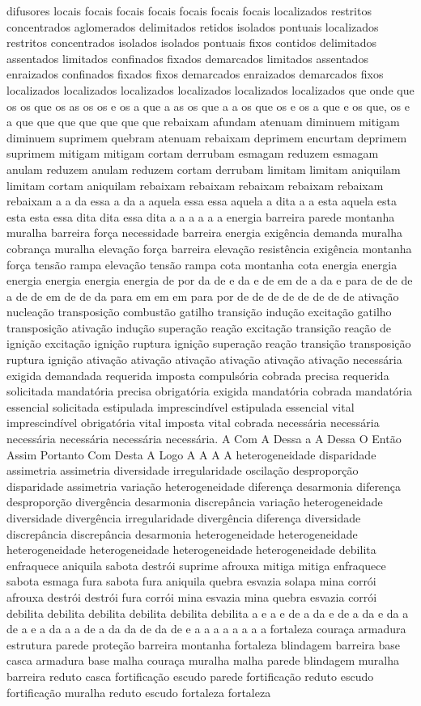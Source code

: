 difusores locais focais focais focais focais focais focais localizados restritos concentrados aglomerados delimitados retidos isolados pontuais localizados restritos concentrados isolados isolados pontuais fixos contidos delimitados assentados limitados confinados fixados demarcados limitados assentados enraizados confinados fixados fixos demarcados enraizados demarcados fixos localizados localizados localizados localizados localizados localizados que onde que os os que os as os os e os a que a as os que a a os que os e os a que e os que, os e a que que que que que que que rebaixam afundam atenuam diminuem mitigam diminuem suprimem quebram atenuam rebaixam deprimem encurtam deprimem suprimem mitigam mitigam cortam derrubam esmagam reduzem esmagam anulam reduzem anulam reduzem cortam derrubam limitam limitam aniquilam limitam cortam aniquilam rebaixam rebaixam rebaixam rebaixam rebaixam rebaixam a a da essa a da a aquela essa essa aquela a dita a a esta aquela esta esta esta essa dita dita essa dita a a a a a a energia barreira parede montanha muralha barreira força necessidade barreira energia exigência demanda muralha cobrança muralha elevação força barreira elevação resistência exigência montanha força tensão rampa elevação tensão rampa cota montanha cota energia energia energia energia energia energia de por da de e da e de em de a da e para de de de a de de em de de da para em em em para por de de de de de de de de ativação nucleação transposição combustão gatilho transição indução excitação gatilho transposição ativação indução superação reação excitação transição reação de ignição excitação ignição ruptura ignição superação reação transição transposição ruptura ignição ativação ativação ativação ativação ativação ativação necessária exigida demandada requerida imposta compulsória cobrada precisa requerida solicitada mandatória precisa obrigatória exigida mandatória cobrada mandatória essencial solicitada estipulada imprescindível estipulada essencial vital imprescindível obrigatória vital imposta vital cobrada necessária necessária necessária necessária necessária necessária. A Com A Dessa a A Dessa O Então Assim Portanto Com Desta A Logo A A A A heterogeneidade disparidade assimetria assimetria diversidade irregularidade oscilação desproporção disparidade assimetria variação heterogeneidade diferença desarmonia diferença desproporção divergência desarmonia discrepância variação heterogeneidade diversidade divergência irregularidade divergência diferença diversidade discrepância discrepância desarmonia heterogeneidade heterogeneidade heterogeneidade heterogeneidade heterogeneidade heterogeneidade debilita enfraquece aniquila sabota destrói suprime afrouxa mitiga mitiga enfraquece sabota esmaga fura sabota fura aniquila quebra esvazia solapa mina corrói afrouxa destrói destrói fura corrói mina esvazia mina quebra esvazia corrói debilita debilita debilita debilita debilita debilita a e a e de a da e de a da e da a de a e a da a a de a da da de da de e a a a a a a a a fortaleza couraça armadura estrutura parede proteção barreira montanha fortaleza blindagem barreira base casca armadura base malha couraça muralha malha parede blindagem muralha barreira reduto casca fortificação escudo parede fortificação reduto escudo fortificação muralha reduto escudo fortaleza fortaleza 